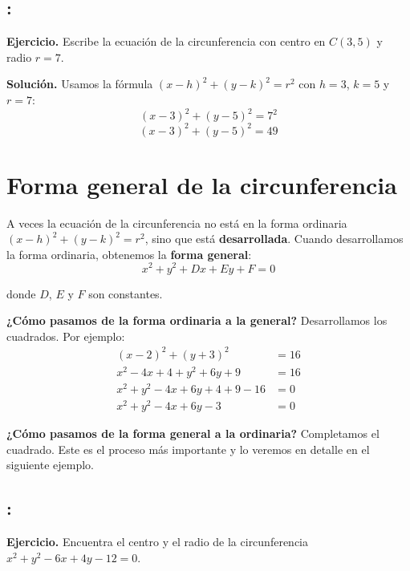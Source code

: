\documentclass[12pt,a4paper]{article}
\begin{document}
	\bigskip

	\subsection*{{\color{blue!40!red}{Ejemplo 4}}: \color{blue!80!black}{Encontrar la ecuación dados el centro y el radio}}

	\textbf{Ejercicio.} Escribe la ecuación de la circunferencia con centro en $C(3,5)$ y radio $r=7$.

	\bigskip

	\textbf{Solución.} Usamos la fórmula $(x-h)^2+(y-k)^2=r^2$ con $h=3$, $k=5$ y $r=7$:
	\[
	(x-3)^2+(y-5)^2=7^2
	\]
	\[
	\boxed{(x-3)^2+(y-5)^2=49}
	\]

	\section{Forma general de la circunferencia}

	A veces la ecuación de la circunferencia no está en la forma ordinaria $(x-h)^2+(y-k)^2=r^2$, sino que está \textbf{desarrollada}. Cuando desarrollamos la forma ordinaria, obtenemos la \textbf{forma general}:
	\[
	\boxed{x^2+y^2+Dx+Ey+F=0}
	\]

	donde $D$, $E$ y $F$ son constantes.

	\bigskip

	\textbf{¿Cómo pasamos de la forma ordinaria a la general?} Desarrollamos los cuadrados. Por ejemplo:
	\[
	\begin{aligned}
		(x-2)^2+(y+3)^2&=16\\
		x^2-4x+4+y^2+6y+9&=16\\
		x^2+y^2-4x+6y+4+9-16&=0\\
		x^2+y^2-4x+6y-3&=0
	\end{aligned}
	\]

	\bigskip

	\textbf{¿Cómo pasamos de la forma general a la ordinaria?} Completamos el cuadrado. Este es el proceso más importante y lo veremos en detalle en el siguiente ejemplo.

	\subsection*{{\color{blue!40!red}{Ejemplo 5}}: \color{blue!80!black}{Completar el cuadrado}}

	\textbf{Ejercicio.} Encuentra el centro y el radio de la circunferencia $x^2+y^2-6x+4y-12=0$.

	\bigskip
\end{document}
